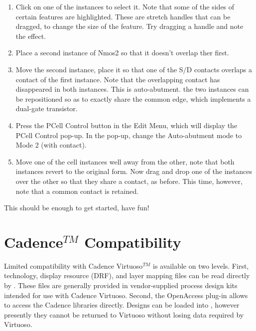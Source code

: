 \begin{enumerate}
\item{Click on one of the instances to select it.  Note that some of
the sides of certain features are highlighted.  These are stretch
handles that can be dragged, to change the size of the feature.  Try
dragging a handle and note the effect.}

\item{Place a second instance of {\vt Nmos2} so that it doesn't
overlap ther first.}

\item{Move the second instance, place it so that one of the S/D
contacts overlaps a contact of the first instance.  Note that the
overlapping contact has disappeared in both instances.  This is
auto-abutment.  the two instances can be repositioned so as to exactly
share the common edge, which implements a dual-gate transistor.}

\item{Press the {\cb PCell Control} button in the {\cb Edit Menu},
which will display the {\cb PCell Control} pop-up.  In the pop-up,
change the {\cb Auto-abutment mode} to {\cb Mode 2 (with contact)}.}

\item{Move one of the cell instances well away from the other, note
that both instances revert to the original form.  Now drag and drop
one of the instances over the other so that they share a contact, as
before.  This time, however, note that a common contact is retained.}
\end{enumerate}

This should be enough to get started, have fun!


\section{Cadence$^{TM}$ Compatibility}
\label{cdscompat}

Limited compatibility with Cadence Virtuoso$^{TM}$ is available on two
levels.  First, technology, display resource (DRF), and layer mapping
files can be read directly by {\Xic}.  These files are generally
provided in vendor-supplied process design kits intended for use with
Cadence Virtuoso.  Second, the OpenAccess plug-in allows {\Xic} to
access the Cadence libraries directly.  Designs can be loaded into
{\Xic}, however presently they cannot be returned to Virtuoso without
losing data required by Virtuoso.

